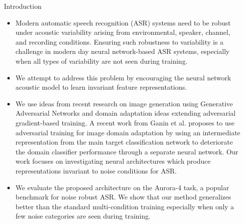 \documentclass[final]{beamer}
\newlength{\sepwid}
\newlength{\onecolwid}
\begin{document}
\begin{frame}[t] %

\begin{columns}[t] %

\begin{column}{\sepwid}\end{column} %

\begin{column}{\onecolwid} %


\begin{block}{Introduction}
    \begin{itemize}
        \item 
    Modern automatic speech recognition (ASR) systems need to be robust under 
    acoustic variability arising from environmental, speaker, channel, and recording 
    conditions. Ensuring such robustness to variability is a challenge in modern day 
    neural network-based ASR systems, especially when all types of variability are 
    not seen during training. 
    
        \item We attempt to address this problem by encouraging the 
    neural network acoustic model to learn invariant feature representations.
        
        \item We use ideas from recent research on image generation using
    Generative Adversarial Networks and domain adaptation ideas extending
    adversarial gradient-based training. A recent work from Ganin et al. proposes to
    use adversarial training for image domain adaptation by using an intermediate
    representation from the main target classification network to deteriorate the 
    domain 
    classifier performance through a separate neural network.
    Our work focuses on investigating neural architectures which produce
    representations invariant to noise conditions for ASR.  
        \item We evaluate the proposed 
    architecture on the Aurora-4 task, a popular benchmark for
    noise robust ASR. We show that our method generalizes better than the standard 
    multi-condition training especially when only a few noise categories are seen 
    during training.
    \end{itemize}


\end{block}
\end{column}
\end{columns}
\end{frame}
\end{document}
